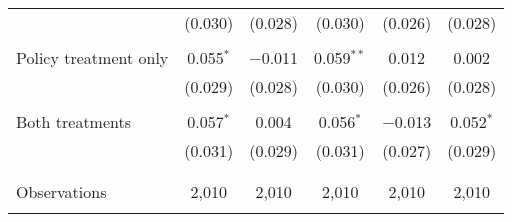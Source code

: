 \begin{tabular}{@{\extracolsep{5pt}}lccccc}
  & (0.030) & (0.028) & (0.030) & (0.026) & (0.028) \\ 
  & & & & & \\ 
 Policy treatment only & 0.055$^{*}$ & $-$0.011 & 0.059$^{**}$ & 0.012 & 0.002 \\ 
  & (0.029) & (0.028) & (0.030) & (0.026) & (0.028) \\ 
  & & & & & \\ 
 Both treatments & 0.057$^{*}$ & 0.004 & 0.056$^{*}$ & $-$0.013 & 0.052$^{*}$ \\ 
  & (0.031) & (0.029) & (0.031) & (0.027) & (0.029) \\ 
  & & & & & \\ 
\hline \\[-1.8ex] 

Observations & 2,010 & 2,010 & 2,010 & 2,010 & 2,010 \\ 
\hline 
\hline \\[-1.8ex] 
\end{tabular} 